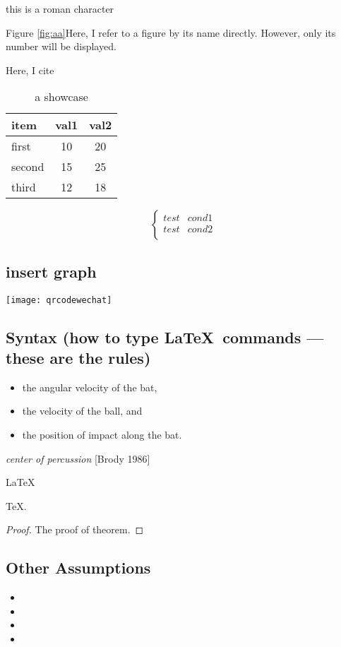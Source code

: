 \documentclass{mcmthesis}
\begin{document}
this is a roman character\uppercase\expandafter{}

Figure \ref{fig:aa}Here, I refer to a figure by its name directly. However, only its number will be displayed.

Here, I cite \cite{1}

\begin{table}
  \centering
  \begin{tabular}{lcc}
    \toprule
    \textbf{item} & \textbf{val1} & \textbf{val2} \\
    \midrule
    first & 10 & 20 \\
    second & 15 & 25 \\
    third & 12 & 18 \\
    \bottomrule
  \end{tabular}
  \caption{a showcase}
  \label{tab:example}
\end{table}
\[
\begin{cases}
 test&cond1\\
 test&cond2\\ 
\end{cases}
\]
\subsection{insert graph}
\centerline{\texttt{[image: qrcodewechat]}}

\subsection{Syntax (how to type \LaTeX\ commands --- these
  are the rules)}
  

\begin{itemize}[\#]
\item the angular velocity of the bat,
\item the velocity of the ball, and
\item the position of impact along the bat.
\end{itemize}
\emph{center of percussion} [Brody 1986]

\begin{Theorem} \label{thm:latex}
\LaTeX
\end{Theorem}
\begin{Lemma} \label{thm:tex}
\TeX .
\end{Lemma}
\begin{proof}
The proof of theorem.
\end{proof}

\subsection{Other Assumptions}
\begin{itemize}
\item
\item
\item
\item
\end{itemize}
\end{document}
